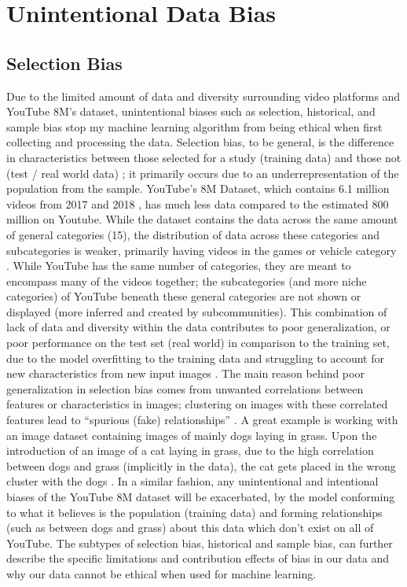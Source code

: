 \documentclass[10pt,twocolumn]{article}
\begin{document}
\section {Unintentional Data Bias}

\subsection {Selection Bias}

Due to the limited amount of data and diversity surrounding video platforms and YouTube 8M’s dataset, unintentional biases such as selection, historical, and sample bias stop my machine learning algorithm from being ethical when first collecting and processing the data.
Selection bias, to be general, is the difference in characteristics between those selected for a study (training data) and those not (test / real world data) \cite{Yu2020}; it primarily occurs due to an underrepresentation of the population from the sample. YouTube’s 8M Dataset, which contains 6.1 million videos from 2017 and 2018 \cite{googleYT8M}, has much less data compared to the estimated 800 million on Youtube. While the dataset contains the data across the same amount of general categories (15), the distribution of data across these categories and subcategories is weaker, primarily having videos in the games or vehicle category \cite{googleYT8M}. While YouTube has the same number of categories, they are meant to encompass many of the videos together; the subcategories (and more niche categories) of YouTube beneath these general categories are not shown or displayed (more inferred and created by subcommunities). This combination of lack of data and diversity within the data contributes to poor generalization, or poor performance on the test set (real world) in comparison to the training set, due to the model overfitting to the training data and struggling to account for new characteristics from new input images \cite{Yu2020}. The main reason behind poor generalization in selection bias comes from unwanted correlations between features or characteristics in images; clustering on images with these correlated features lead to “spurious (fake) relationships” \cite{Yu2020}. A great example is working with an image dataset containing images of mainly dogs laying in grass. Upon the introduction of an image of a cat laying in grass, due to the high correlation between dogs and grass (implicitly in the data), the cat gets placed in the wrong cluster with the dogs \cite{Wang2020}. In a similar fashion, any unintentional and intentional biases of the YouTube 8M dataset will be exacerbated, by the model conforming to what it believes is the population (training data) and forming relationships (such as between dogs and grass) about this data which don’t exist on all of YouTube. The subtypes of selection bias, historical and sample bias, can further describe the specific limitations and contribution effects of bias in our data and why our data cannot be ethical when used for machine learning.
\end{document}
